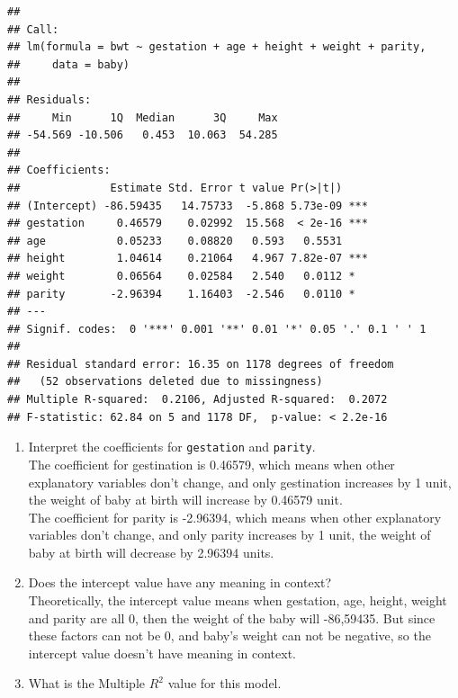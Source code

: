 \documentclass[]{article}
\newenvironment{Shaded}{\begin{snugshade}}{\end{snugshade}}
\newcommand{\DataTypeTok}[1]{\textcolor[rgb]{0.13,0.29,0.53}{#1}}
\newcommand{\KeywordTok}[1]{\textcolor[rgb]{0.13,0.29,0.53}{\textbf{#1}}}
\newcommand{\NormalTok}[1]{#1}
\newcommand{\OperatorTok}[1]{\textcolor[rgb]{0.81,0.36,0.00}{\textbf{#1}}}
\newcommand{\StringTok}[1]{\textcolor[rgb]{0.31,0.60,0.02}{#1}}
\begin{document}
\begin{Shaded}
\end{Shaded}

\begin{verbatim}
## 
## Call:
## lm(formula = bwt ~ gestation + age + height + weight + parity, 
##     data = baby)
## 
## Residuals:
##     Min      1Q  Median      3Q     Max 
## -54.569 -10.506   0.453  10.063  54.285 
## 
## Coefficients:
##              Estimate Std. Error t value Pr(>|t|)    
## (Intercept) -86.59435   14.75733  -5.868 5.73e-09 ***
## gestation     0.46579    0.02992  15.568  < 2e-16 ***
## age           0.05233    0.08820   0.593   0.5531    
## height        1.04614    0.21064   4.967 7.82e-07 ***
## weight        0.06564    0.02584   2.540   0.0112 *  
## parity       -2.96394    1.16403  -2.546   0.0110 *  
## ---
## Signif. codes:  0 '***' 0.001 '**' 0.01 '*' 0.05 '.' 0.1 ' ' 1
## 
## Residual standard error: 16.35 on 1178 degrees of freedom
##   (52 observations deleted due to missingness)
## Multiple R-squared:  0.2106, Adjusted R-squared:  0.2072 
## F-statistic: 62.84 on 5 and 1178 DF,  p-value: < 2.2e-16
\end{verbatim}

\begin{enumerate}
\def\labelenumi{\arabic{enumi}.}
\setcounter{enumi}{2}
\item
  Interpret the coefficients for \texttt{gestation} and
  \texttt{parity}.\\
  The coefficient for gestination is 0.46579, which means when other
  explanatory variables don't change, and only gestination increases by
  1 unit, the weight of baby at birth will increase by 0.46579 unit.\\
  The coefficient for parity is -2.96394, which means when other
  explanatory variables don't change, and only parity increases by 1
  unit, the weight of baby at birth will decrease by 2.96394 units.
\item
  Does the intercept value have any meaning in context?\\
  Theoretically, the intercept value means when gestation, age, height,
  weight and parity are all 0, then the weight of the baby will
  -86,59435. But since these factors can not be 0, and baby's weight can
  not be negative, so the intercept value doesn't have meaning in
  context.
\item
  What is the Multiple \(R^2\) value for this model.
\end{enumerate}
\end{document}
